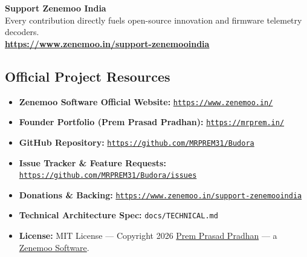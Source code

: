 \documentclass[11pt,a4paper]{article}
\begin{document}
\vspace{0.4cm}
\begin{center}
    \begin{tcolorbox}[colback=BudoraNavy,colframe=BudoraGreen,width=0.88\linewidth,arc=6pt,center]
        \centering
        \color{white}
        {\Large \textbf{Support Zenemoo India}}\\[4pt]
        {\normalsize Every contribution directly fuels open-source innovation and firmware telemetry decoders.}\\[8pt]
        \href{https://www.zenemoo.in/support-zenemooindia}{\large \textbf{\color{BudoraGreen} https://www.zenemoo.in/support-zenemooindia}}
    \end{tcolorbox}
\end{center}

\vspace{0.4cm}

\subsection{Official Project Resources}
\begin{itemize}
    \item \textbf{Zenemoo Software Official Website:} \href{https://www.zenemoo.in/}{\texttt{https://www.zenemoo.in/}}
    \item \textbf{Founder Portfolio (Prem Prasad Pradhan):} \href{https://mrprem.in/}{\texttt{https://mrprem.in/}}
    \item \textbf{GitHub Repository:} \href{https://github.com/MRPREM31/Budora}{\texttt{https://github.com/MRPREM31/Budora}}
    \item \textbf{Issue Tracker \& Feature Requests:} \href{https://github.com/MRPREM31/Budora/issues}{\texttt{https://github.com/MRPREM31/Budora/issues}}
    \item \textbf{Donations \& Backing:} \href{https://www.zenemoo.in/support-zenemooindia}{\texttt{https://www.zenemoo.in/support-zenemooindia}}
    \item \textbf{Technical Architecture Spec:} \texttt{docs/TECHNICAL.md}
    \item \textbf{License:} MIT License --- Copyright \textcopyright{} 2026 \href{https://mrprem.in/}{Prem Prasad Pradhan} --- a \href{https://www.zenemoo.in/}{Zenemoo Software}.
\end{itemize}
\end{document}
